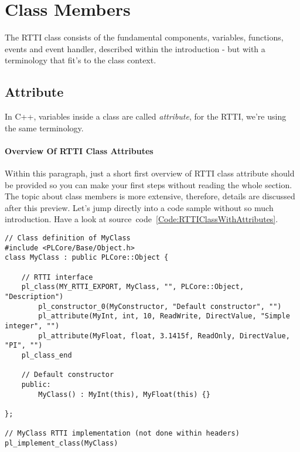 \section{Class Members}
The RTTI class consists of the fundamental components, variables, functions, events and event handler, described within the introduction - but with a terminology that fit's to the class context.



\subsection{Attribute}
In C++, variables inside a class are called \emph{attribute}, for the RTTI, we're using the same terminology.


\paragraph{Overview Of RTTI Class Attributes}
Within this paragraph, just a short first overview of RTTI class attribute should be provided so you can make your first steps without reading the whole section. The topic about class members is more extensive, therefore, details are discussed after this preview. Let's jump directly into a code sample without so much introduction. Have a look at source~code~\ref{Code:RTTIClassWithAttributes}.
\begin{lstlisting}[float=htb,label=Code:RTTIClassWithAttributes,caption={Defining a new RTTI class with attributes}]
// Class definition of MyClass
#include <PLCore/Base/Object.h>
class MyClass : public PLCore::Object {

	// RTTI interface
	pl_class(MY_RTTI_EXPORT, MyClass, "", PLCore::Object, "Description")
		pl_constructor_0(MyConstructor, "Default constructor", "")
		pl_attribute(MyInt, int, 10, ReadWrite, DirectValue, "Simple integer", "")
		pl_attribute(MyFloat, float, 3.1415f, ReadOnly, DirectValue, "PI", "")
	pl_class_end

	// Default constructor
	public:
		MyClass() : MyInt(this), MyFloat(this) {}

};

// MyClass RTTI implementation (not done within headers)
pl_implement_class(MyClass)
\end{lstlisting}
